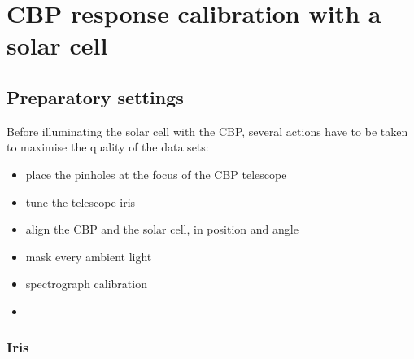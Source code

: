 \section{CBP response calibration with a solar cell}
\label{sec:rcbp}


%
%
%
%
%
%
%
%


\subsection{Preparatory settings}

Before illuminating the solar cell with the CBP, several actions have to be taken to maximise the quality of the data sets:
\begin{itemize}
\item place the pinholes at the focus of the CBP telescope
\item tune the telescope iris
\item align the CBP and the solar cell, in position and angle
\item mask every ambient light
\item spectrograph calibration
\item {}
\end{itemize}


\subsubsection{Iris}

